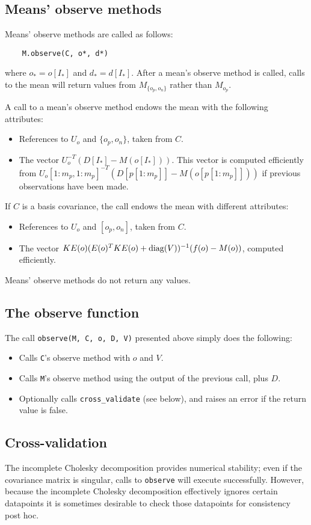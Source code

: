 \documentclass{report}
\begin{document}
\subsection{Means' observe methods}
Means' observe methods are called as follows:
\begin{verbatim}
    M.observe(C, o*, d*)
\end{verbatim}
where $o_*=o[{I_*}]$ and $d_*=d[{I_*}]$. After a mean's observe method is called, calls to the mean will return values from $M_{\{o_p, o_n\}}$ rather than $M_{o_p}$.

A call to a mean's observe method endows the mean with the following attributes:
\begin{itemize}
        \item References to $U_o$ and $\{o_p, o_n\}$, taken from $C$.
        \item The vector $U_o^{-T} (D[I_*] - M(o[I_*]))$. This vector is computed efficiently from $U_o[1:m_p,1:m_p]^{-T} (D[p[1:m_p]] - M(o[p[1:m_p]]))$ if previous observations have been made.
\end{itemize}

If $C$ is a basis covariance, the call endows the mean with different attributes:
\begin{itemize}
    \item References to $U_o$ and $[o_p, o_n]$, taken from $C$.
    \item The vector $KE(o)(E(o)^TKE(o) + \textup{diag}(V))^{-1}(f(o)-M(o))$, computed efficiently.
\end{itemize}

Means' observe methods do not return any values.

\subsection{The observe function}
The call \texttt{observe(M, C, o, D, V)} presented above simply does the following:
\begin{itemize}
    \item Calls \texttt{C}'s observe method with $o$ and $V$.
    \item Calls \texttt{M}'s observe method using the output of the previous call, plus $D$.
    \item Optionally calls \texttt{cross\_validate} (see below), and raises an error if the return value is false.
\end{itemize}

\subsection{Cross-validation}
The incomplete Cholesky decomposition provides numerical stability; even if the covariance matrix is singular, calls to \texttt{observe} will execute successfully. However, because the incomplete Cholesky decomposition effectively ignores certain datapoints it is sometimes desirable to check those datapoints for consistency post hoc.
\end{document}
